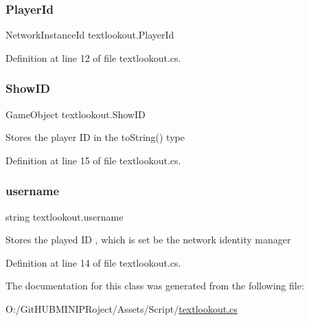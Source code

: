 \subsubsection{\texorpdfstring{PlayerId}{PlayerId}}
{\footnotesize\ttfamily Network\+Instance\+Id textlookout.\+Player\+Id}



Definition at line 12 of file textlookout.\+cs.

\mbox{\label{classtextlookout_abacc824a1723ee526ca9eb4258ba1b4e}} 
\subsubsection{\texorpdfstring{ShowID}{ShowID}}
{\footnotesize\ttfamily Game\+Object textlookout.\+Show\+ID}

Stores the player ID in the to\+String() type 

Definition at line 15 of file textlookout.\+cs.

\mbox{\label{classtextlookout_af0ca4bb5aa12ae3fc8dac76ad15460de}} 
\subsubsection{\texorpdfstring{username}{username}}
{\footnotesize\ttfamily string textlookout.\+username}

Stores the played ID , which is set be the network identity manager 

Definition at line 14 of file textlookout.\+cs.



The documentation for this class was generated from the following file\+:\begin{DoxyCompactItemize}
\item 
O\+:/\+Git\+H\+U\+B\+M\+I\+N\+I\+P\+Roject/\+Assets/\+Script/\mbox{\hyperlink{textlookout_8cs}{textlookout.\+cs}}\end{DoxyCompactItemize}
